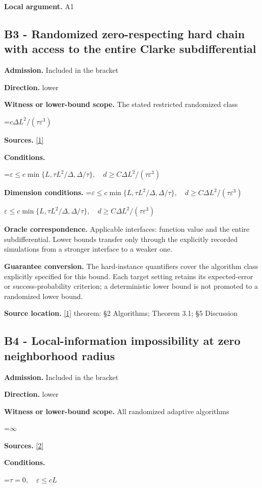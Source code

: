\documentclass[10pt,a4paper]{article}
\newcommand{\AtlasMath}[1]{\par\begingroup\centering\setbox0=\hbox{$\displaystyle #1$}\ifdim\wd0>1.4\linewidth\typeout{ATLAS WIDE FORMULA: \the\wd0}\fi\ifdim\wd0>\linewidth\resizebox{\linewidth}{!}{\box0}\else\box0\fi\par\endgroup}
\newcommand{\AtlasInlineMath}[1]{\begingroup\setbox0=\hbox{$#1$}\ifdim\wd0>.4\linewidth\endgroup\AtlasMath{#1}\else\endgroup$#1$\fi}
\begin{document}
\textbf{Local argument.} A1

\subsection{B3 - Randomized zero-respecting hard chain with access to the entire Clarke subdifferential}
\textbf{Admission.} Included in the bracket

\textbf{Direction.} lower

\textbf{Witness or lower-bound scope.} The stated restricted randomized class

\AtlasMath{c\Delta L^2/(\tau\varepsilon^3)}
\textbf{Sources.} \href{https://arxiv.org/pdf/2609.17780}{[1]}

\textbf{Conditions.} 
\AtlasMath{\varepsilon\le c\min\{L,\tau L^2/\Delta,\Delta/\tau\},\quad d\ge C\Delta L^2/(\tau\varepsilon^3)}


\textbf{Dimension conditions.} \AtlasInlineMath{\varepsilon\le c\min\{L,\tau L^2/\Delta,\Delta/\tau\},\quad d\ge C\Delta L^2/(\tau\varepsilon^3)}

\textbf{Oracle correspondence.} Applicable interfaces: function value and the entire subdifferential. Lower bounds transfer only through the explicitly recorded simulations from a stronger interface to a weaker one.

\textbf{Guarantee conversion.} The hard-instance quantifiers cover the algorithm class explicitly specified for this bound. Each target setting retains its expected-error or success-probability criterion; a deterministic lower bound is not promoted to a randomized lower bound.

\textbf{Source location.} \href{https://arxiv.org/pdf/2609.17780}{[1]} theorem: §2 Algorithms; Theorem 3.1; §5 Discussion

\subsection{B4 - Local-information impossibility at zero neighborhood radius}
\textbf{Admission.} Included in the bracket

\textbf{Direction.} lower

\textbf{Witness or lower-bound scope.} All randomized adaptive algorithms

\AtlasMath{\infty}
\textbf{Sources.} \href{https://www.jmlr.org/papers/volume23/21-1507/21-1507.pdf}{[2]}

\textbf{Conditions.} 
\AtlasMath{\tau=0,\quad\varepsilon\le cL}
\end{document}
